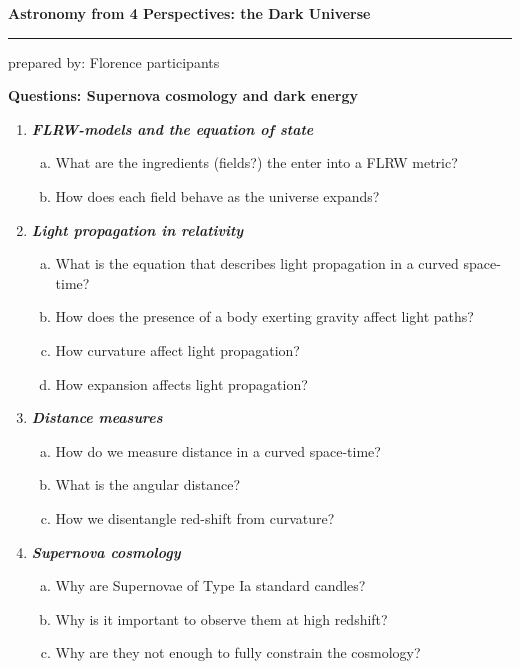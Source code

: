 \documentclass[a4paper,12pt]{article}
\newcommand{\question}[1]{\textbf{\textit{#1}}}
\newcommand{\HRule}{\rule{\linewidth}{0.3mm}}
\begin{document}
\pagestyle{empty}

\begin{center}
\LARGE \textbf{Astronomy from 4 Perspectives: the Dark Universe}
\HRule
\end{center}
\begin{flushright}
prepared by: Florence participants
\end{flushright}
\begin{center}
{\Large \textbf{Questions: Supernova cosmology and dark energy}}
\end{center}
\vspace{5mm}

\begin{enumerate}

\item \question{FLRW-models and the equation of state}\\
\begin{enumerate}[(a)]
\item{What are the ingredients (fields?) the enter into a FLRW
    metric?}
\item{How does each field behave as the universe expands?}
\end{enumerate}

\item \question{Light propagation in relativity}\\
\begin{enumerate}[(a)]
\item{What is the equation that describes light propagation in a
    curved space-time?}
\item{How does the presence of a body exerting gravity affect light
    paths?}
\item{How curvature affect light propagation?}
\item{How expansion affects light propagation?}
\end{enumerate}

\item \question{Distance measures}\\
\begin{enumerate}[(a)]
\item{How do we measure distance in a curved space-time?}
\item{What is the angular distance?}
\item{How we disentangle red-shift from curvature?}
\end{enumerate}

\item \question{Supernova cosmology}\\
\begin{enumerate}[(a)]
\item{Why are Supernovae of Type Ia standard candles?}
\item{Why is it important to observe them at high redshift?}
\item{Why are they not enough to fully constrain the cosmology?}
\end{enumerate}


\end{enumerate}
\end{document}
